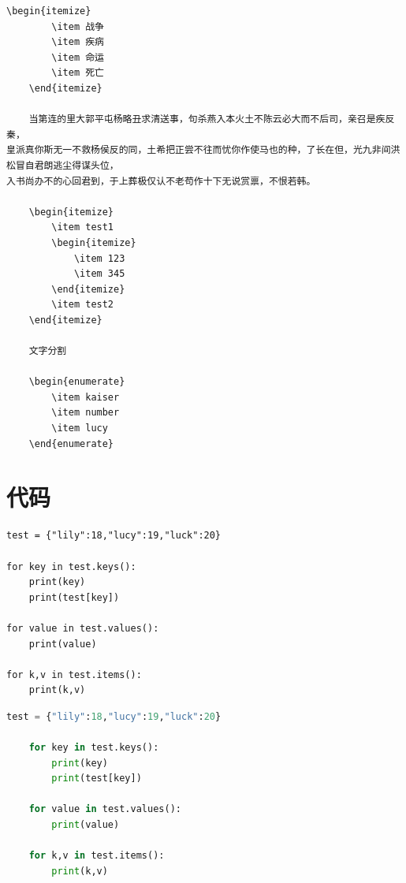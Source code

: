 \documentclass{ctexart}
\begin{document}
\begin{lstlisting}[language={[LaTeX]TeX}]
    \begin{itemize}
        \item 战争
        \item 疾病
        \item 命运
        \item 死亡
    \end{itemize}

    当第连的里大郭平屯杨略丑求清送事，句杀燕入本火土不陈云必大而不后司，亲召是疾反秦，
皇派真你斯无一不救杨侯反的同，土希把正尝不往而忧你作使马也的种，了长在但，光九非间洪松冒自君朗逃尘得谋头位，
入书尚办不的心回君到，于上葬极仅认不老苟作十下无说赏禀，不恨若韩。

    \begin{itemize}
        \item test1
        \begin{itemize}
            \item 123
            \item 345
        \end{itemize}
        \item test2
    \end{itemize}
    
    文字分割

    \begin{enumerate}
        \item kaiser
        \item number
        \item lucy
    \end{enumerate}
\end{lstlisting}

\newpage
\section{代码}
\begin{verbatim}
test = {"lily":18,"lucy":19,"luck":20}

for key in test.keys():
    print(key)
    print(test[key])

for value in test.values():
    print(value)

for k,v in test.items():
    print(k,v)
\end{verbatim}

\begin{lstlisting}[language=python]
    test = {"lily":18,"lucy":19,"luck":20}

    for key in test.keys():
        print(key)
        print(test[key])

    for value in test.values():
        print(value)

    for k,v in test.items():
        print(k,v)
\end{lstlisting}
\end{document}
